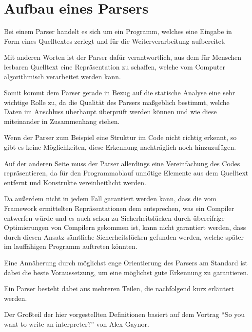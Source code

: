     \section{Aufbau eines Parsers}\label{Aufbau eines Parsers}
        Bei einem Parser handelt es sich um ein Programm,
        welches eine Eingabe in Form eines Quelltextes zerlegt und
        für die Weiterverarbeitung aufbereitet.

        Mit anderen Worten ist der Parser dafür verantwortlich,
        aus dem für Menschen lesbaren Quelltext eine Repräsentation zu schaffen,
        welche vom Computer algorithmisch verarbeitet werden kann.

        Somit kommt dem Parser gerade in Bezug auf die statische Analyse eine sehr wichtige Rolle zu,
        da die Qualität des Parsers maßgeblich bestimmt,
        welche Daten im Anschluss überhaupt überprüft werden können und
        wie diese miteinander in Zusammenhang stehen.

        Wenn der Parser zum Beispiel eine Struktur im Code nicht richtig erkennt,
        so gibt es keine Möglichkeiten,
        diese Erkennung nachträglich noch hinzuzufügen.

        Auf der anderen Seite muss der Parser allerdings eine Vereinfachung des Codes repräsentieren,
        da für den Programmablauf unnötige Elemente aus dem Quelltext entfernt und
        Konstrukte vereinheitlicht werden.

        Da außerdem nicht in jedem Fall garantiert werden kann,
        dass die vom Framework ermittelten Repräsentationen dem entsprechen,
        was ein Compiler entwerfen würde und
        es auch schon zu Sicherheitslücken durch übereifrige Optimierungen von Compilern gekommen ist,\cite{Wang2012}
        kann nicht garantiert werden,
        dass durch diesen Ansatz sämtliche Sicherheitslücken gefunden werden,
        welche später im lauffähigen Programm auftreten könnten.

        Eine Annäherung durch möglichst enge Orientierung des Parsers am Standard ist dabei die beste Voraussetzung,
        um eine möglichst gute Erkennung zu garantieren.

        Ein Parser besteht dabei aus mehreren Teilen,
        die nachfolgend kurz erläutert werden.

        Der Großteil der hier vorgestellten Definitionen basiert auf dem Vortrag
        \foreignquote{english}{So you want to write an interpreter?} von Alex Gaynor.\cite{Gaynor2013}

